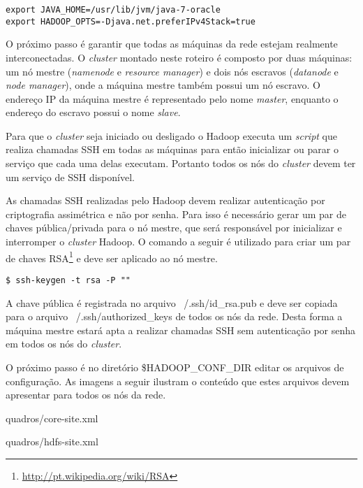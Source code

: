 \begin{apendicesenv}
\begin{lstlisting}[style=abnt,frame=single]
export JAVA_HOME=/usr/lib/jvm/java-7-oracle
export HADOOP_OPTS=-Djava.net.preferIPv4Stack=true 
\end{lstlisting}


O próximo passo é garantir que todas as máquinas da rede estejam realmente interconectadas. O \textit{cluster} montado neste roteiro é composto por duas máquinas: um nó mestre (\textit{namenode} e \textit{resource manager}) e dois nós escravos (\textit{datanode} e \textit{node manager}), onde a máquina mestre também possui um nó escravo. O endereço IP da máquina mestre é representado pelo nome \textit{master}, enquanto o endereço do escravo possui o nome \textit{slave}.

Para que o \textit{cluster} seja iniciado ou desligado o Hadoop executa um \textit{script} que realiza chamadas SSH em todas as máquinas para então inicializar ou parar o serviço que cada uma delas executam. Portanto todos os nós do \textit{cluster} devem ter um serviço de SSH disponível.

As chamadas SSH realizadas pelo Hadoop devem realizar autenticação por criptografia assimétrica e não por senha. Para isso é necessário gerar um par de chaves pública/privada para o nó mestre, que será responsável por inicializar e interromper o \textit{cluster} Hadoop. O comando a seguir é utilizado para criar um par de chaves RSA\footnote{\url{http://pt.wikipedia.org/wiki/RSA}} e deve ser aplicado ao nó mestre.

\begin{lstlisting}[style=abnt,frame=single]
$ ssh-keygen -t rsa -P ""
\end{lstlisting}

A chave pública é registrada no arquivo ~/.ssh/id\_rsa.pub e deve ser copiada para o arquivo ~/.ssh/authorized\_keys de todos os nós da rede. Desta forma a máquina mestre estará apta a realizar chamadas SSH sem autenticação por senha em todos os nós do \textit{cluster}.

O próximo passo é no diretório \$HADOOP\_CONF\_DIR editar os arquivos de configuração. As imagens a seguir ilustram o conteúdo que estes arquivos devem apresentar para todos os nós da rede.


		{quadros/core-site.xml}

\newpage

		{quadros/hdfs-site.xml}


\end{apendicesenv}
